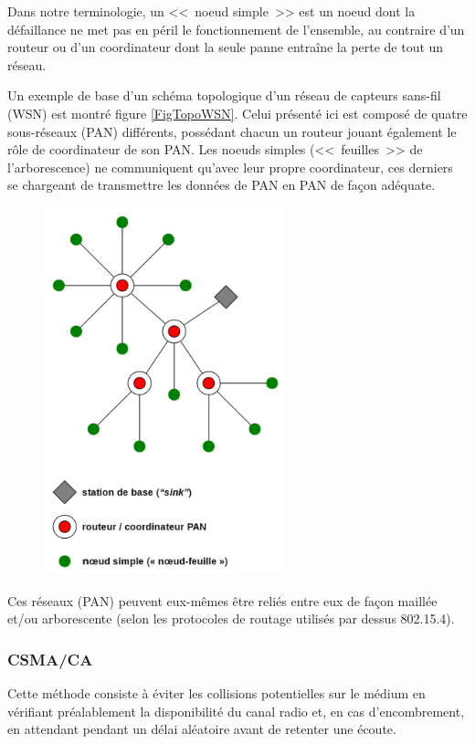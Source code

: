 Dans notre terminologie, un <<~noeud simple~>> est un noeud dont la
défaillance ne met pas en péril le fonctionnement de l'ensemble,
au contraire d'un routeur ou d'un coordinateur dont la seule panne
entraîne la perte de tout un réseau.

Un exemple de base d'un schéma topologique d'un réseau de capteurs
sans-fil (WSN) est montré figure \vref{FigTopoWSN}. Celui présenté
ici est composé de quatre sous-réseaux (PAN) différents, possédant chacun
un routeur jouant également le rôle de coordinateur de son PAN. Les noeuds
simples (<<~feuilles~>> de l'arborescence) ne communiquent qu'avec leur
propre coordinateur, ces derniers se chargeant de transmettre les données
de PAN en PAN de façon adéquate.

\begin{figure}[!hbt]
\centering
\includegraphics[width=7cm]{images/ch3-topo-wsn.png}
\label{FigTopoWSN}
\end{figure}

Ces réseaux (PAN) peuvent eux-mêmes être reliés entre eux de façon maillée
et/ou arborescente (selon les protocoles de routage utilisés par dessus
802.15.4).

\subsubsection{CSMA/CA}
\label{ParCSMACA}

Cette méthode consiste à éviter les collisions potentielles sur le médium
en vérifiant préalablement la disponibilité du canal radio et, en cas
d'encombrement, en attendant pendant un délai aléatoire avant de retenter
une écoute.


